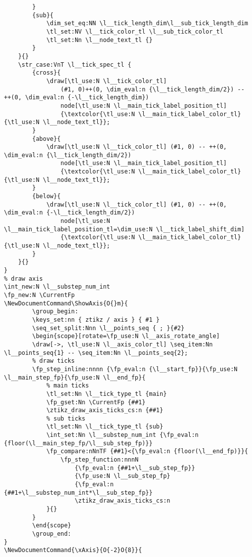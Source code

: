 \begin{verbatim}
        }
        {sub}{
            \dim_set_eq:NN \l__tick_length_dim\l__sub_tick_length_dim
            \tl_set:NV \l__tick_color_tl \l__sub_tick_color_tl
            \tl_set:Nn \l__node_text_tl {}
        }
    }{}
    \str_case:VnT \l__tick_spec_tl {
        {cross}{
            \draw[\tl_use:N \l__tick_color_tl] 
                (#1, 0)++(0, \dim_eval:n {\l__tick_length_dim/2}) -- ++(0, \dim_eval:n {-\l__tick_length_dim}) 
                node[\tl_use:N \l__main_tick_label_position_tl] 
                {\textcolor{\tl_use:N \l__main_tick_label_color_tl}{\tl_use:N \l__node_text_tl}};
        }
        {above}{
            \draw[\tl_use:N \l__tick_color_tl] (#1, 0) -- ++(0, \dim_eval:n {\l__tick_length_dim/2}) 
                node[\tl_use:N \l__main_tick_label_position_tl] 
                {\textcolor{\tl_use:N \l__main_tick_label_color_tl}{\tl_use:N \l__node_text_tl}};
        }
        {below}{
            \draw[\tl_use:N \l__tick_color_tl] (#1, 0) -- ++(0, \dim_eval:n {-\l__tick_length_dim/2}) 
                node[\tl_use:N \l__main_tick_label_position_tl=\dim_use:N \l__tick_label_shift_dim] 
                {\textcolor{\tl_use:N \l__main_tick_label_color_tl}{\tl_use:N \l__node_text_tl}};
        }
    }{}
} 
% draw axis
\int_new:N \l__substep_num_int
\fp_new:N \CurrentFp
\NewDocumentCommand\ShowAxis{O{}m}{
        \group_begin:
        \keys_set:nn { ztikz / axis } { #1 }
        \seq_set_split:Nnn \l__points_seq { ; }{#2}
        \begin{scope}[rotate=\fp_use:N \l__axis_rotate_angle]
        \draw[->, \tl_use:N \l__axis_color_tl] \seq_item:Nn \l__points_seq{1} -- \seq_item:Nn \l__points_seq{2};
        % draw ticks
        \fp_step_inline:nnnn {\fp_eval:n {\l__start_fp}}{\fp_use:N \l__main_step_fp}{\fp_use:N \l__end_fp}{
            % main ticks
            \tl_set:Nn \l__tick_type_tl {main}
            \fp_gset:Nn \CurrentFp {##1}
            \ztikz_draw_axis_ticks_cs:n {##1}
            % sub ticks
            \tl_set:Nn \l__tick_type_tl {sub}
            \int_set:Nn \l__substep_num_int {\fp_eval:n {floor(\l__main_step_fp/\l__sub_step_fp)}}
            \fp_compare:nNnTF {##1}<{\fp_eval:n {floor(\l__end_fp)}}{
                \fp_step_function:nnnN                 
                    {\fp_eval:n {##1+\l__sub_step_fp}}
                    {\fp_use:N \l__sub_step_fp}
                    {\fp_eval:n {##1+\l__substep_num_int*\l__sub_step_fp}}
                    \ztikz_draw_axis_ticks_cs:n
            }{}
        }
        \end{scope}
        \group_end:
}
\NewDocumentCommand{\xAxis}{O{-2}O{8}}{

\end{verbatim}
